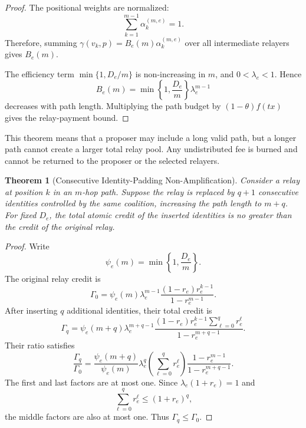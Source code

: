 \documentclass[lettersize,journal]{IEEEtran}
\newtheorem{theorem}{Theorem}
\begin{document}
\begin{proof}
The positional weights are normalized:
\begin{equation}
\sum_{k=1}^{m-1}
\alpha_k^{(m,e)}
=
1.
\end{equation}
Therefore, summing
$\gamma(v_k,p)=B_e(m)\alpha_k^{(m,e)}$
over all intermediate relayers gives $B_e(m)$.

The efficiency term
$\min\{1,D_e/m\}$ is non-increasing in $m$,
and $0<\lambda_e<1$.
Hence
\begin{equation}
B_e(m)
=
\min\left\{1,\frac{D_e}{m}\right\}
\lambda_e^{m-1}
\end{equation}
decreases with path length.
Multiplying the path budget by $(1-\theta)f(tx)$ gives the relay-payment bound.
\end{proof}

This theorem means that a proposer may include a long valid path, but a longer path cannot create a larger total relay pool.
Any undistributed fee is burned and cannot be returned to the proposer or the selected relayers.

\begin{theorem}[Consecutive Identity-Padding Non-Amplification]
\label{thm:path_padding}
Consider a relay at position $k$ in an $m$-hop path.
Suppose the relay is replaced by $q+1$ consecutive identities controlled by the same coalition, increasing the path length to $m+q$.
For fixed $D_e$, the total atomic credit of the inserted identities is no greater than the credit of the original relay.
\end{theorem}

\begin{proof}
Write
\begin{equation}
\psi_e(m)
=
\min\left\{1,\frac{D_e}{m}\right\}.
\end{equation}
The original relay credit is
\begin{equation}
\Gamma_0
=
\psi_e(m)\lambda_e^{m-1}
\frac{(1-r_e)r_e^{k-1}}
{1-r_e^{m-1}}.
\end{equation}
After inserting $q$ additional identities, their total credit is
\begin{equation}
\Gamma_q
=
\psi_e(m+q)\lambda_e^{m+q-1}
\frac{(1-r_e)r_e^{k-1}
\sum_{\ell=0}^{q}r_e^\ell}
{1-r_e^{m+q-1}}.
\end{equation}
Their ratio satisfies
\begin{equation}
\frac{\Gamma_q}{\Gamma_0}
=
\frac{\psi_e(m+q)}{\psi_e(m)}
\lambda_e^q
\left(
\sum_{\ell=0}^{q}r_e^\ell
\right)
\frac{1-r_e^{m-1}}
{1-r_e^{m+q-1}}.
\end{equation}
The first and last factors are at most one.
Since
$\lambda_e(1+r_e)=1$ and
\begin{equation}
\sum_{\ell=0}^{q}r_e^\ell
\leq
(1+r_e)^q,
\end{equation}
the middle factors are also at most one.
Thus $\Gamma_q\leq\Gamma_0$.
\end{proof}
\end{document}
